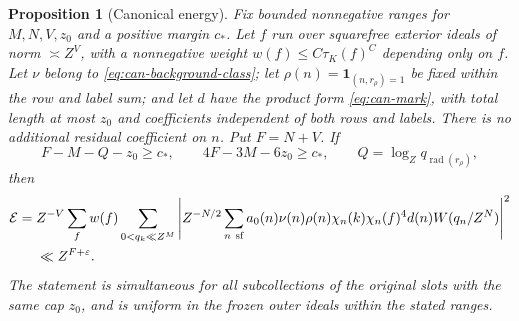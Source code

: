 \documentclass[11pt,a4paper]{article}
\numberwithin{equation}{section}
\newtheorem{proposition}[theorem]{Proposition}
\theoremstyle{definition}
\theoremstyle{remark}
\newcommand{\eps}{\varepsilon}
\newcommand{\rad}{\operatorname{rad}}
\begin{document}
\begin{proposition}[Canonical energy]\label{prop:can-canonical}
Fix bounded nonnegative ranges for $M,N,V,z_0$ and a positive margin
$c_*$.  Let $f$ run over squarefree exterior ideals of norm
$\asymp Z^V$, with a nonnegative weight $w(f)\le C\tau_K(f)^C$
depending only on $f$.  Let $\nu$ belong to
\eqref{eq:can-background-class}; let
$\rho(n)=\mathbf1_{(n,r_\rho)=1}$ be fixed within the row and label
sum; and let $d$ have the product form \eqref{eq:can-mark}, with
total length at most $z_0$ and coefficients independent of both rows
and labels.  There is no additional residual coefficient on $n$.
Put $F=N+V$.  If
\begin{equation}\label{eq:can-invariants}
 F-M-Q-z_0\ge c_*,\qquad 4F-3M-6z_0\ge c_*,
 \qquad Q=\log_Zq_{\rad(r_\rho)},
\end{equation}
then
\begin{align}\label{eq:can-energy}
 \mathcal E={}&Z^{-V}\sum_f w(f)\sum_{0<q_k\ll Z^M}
 \left|Z^{-N/2}\sum_{n\ \mathrm{sf}}a_0(n)\nu(n)\rho(n)
      \chi_n(k)\chi_n(f)^4d(n)W(q_n/Z^N)\right|^2\notag\\
 &\ll Z^{F+\eps}.
\end{align}
The statement is simultaneous for all subcollections of the original
slots with the same cap $z_0$, and is uniform in the frozen outer
ideals within the stated ranges.
\end{proposition}
\end{document}
